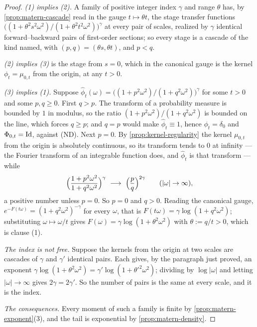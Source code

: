 \begin{proof}
\emph{(1) implies (2).} A \Matern{} family of positive integer index $\gamma$ and range $\theta$
has, by \ref{prop:matern-cascade} read in the gauge $t \mapsto \theta t$, the stage transfer
functions $\bigl((1+\theta^2s^2\omega^2)/(1+\theta^2t^2\omega^2)\bigr)^\gamma$ at every pair of
scales, realized by $\gamma$ identical forward--backward pairs of first-order sections; so every
stage is a cascade of the kind named, with $(p,q) = (\theta s, \theta t)$, and $p < q$.

\emph{(2) implies (3)} is the stage from $s = 0$, which in the canonical gauge is the kernel
$\phi_t = \mu_{0,t}$ from the origin, at any $t > 0$.

\emph{(3) implies (1).} Suppose $\hat\phi_t(\omega) = \bigl((1+p^2\omega^2)/(1+q^2\omega^2)\bigr)
^{\gamma}$ for some $t > 0$ and some $p, q \ge 0$. First $q > p$. The transform of a probability
measure is bounded by $1$ in modulus, so the ratio $(1+p^2\omega^2)/(1+q^2\omega^2)$ is bounded on
the line, which forces $q \ge p$; and $q = p$ would make $\hat\phi_t \equiv 1$, hence
$\phi_t = \delta_0$ and $\Phi_{0,t} = \mathrm{Id}$, against (ND). Next $p = 0$. By
\ref{prop:kernel-regularity} the kernel $\mu_{0,t}$ from the origin is absolutely continuous, so
its transform tends to $0$ at infinity --- the Fourier transform of an integrable function does,
and $\hat\phi_t$ is that transform --- while
\[
  \Bigl(\frac{1 + p^2\omega^2}{1 + q^2\omega^2}\Bigr)^{\gamma}
  \ \longrightarrow\ \Bigl(\frac pq\Bigr)^{2\gamma}
  \qquad (|\omega| \to \infty),
\]
a positive number unless $p = 0$. So $p = 0$ and $q > 0$. Reading the canonical gauge,
$e^{-F(t\omega)} = (1+q^2\omega^2)^{-\gamma}$ for every $\omega$, that is
$F(t\omega) = \gamma\log(1+q^2\omega^2)$; substituting $\omega \mapsto \omega/t$ gives
$F(\omega) = \gamma\log(1+\theta^2\omega^2)$ with $\theta := q/t > 0$, which is clause (1).

\emph{The index is not free.} Suppose the kernels from the origin at two scales are cascades of
$\gamma$ and $\gamma'$ identical pairs. Each gives, by the paragraph just proved, an exponent
$\gamma\log(1+\theta^2\omega^2) = \gamma'\log(1+\theta'^2\omega^2)$; dividing by $\log|\omega|$
and letting $|\omega| \to \infty$ gives $2\gamma = 2\gamma'$. So the number of pairs is the same
at every scale, and it is the index.

\emph{The consequences.} Every moment of such a family is finite by \ref{prop:matern-exponent}(3),
and the tail is exponential by \ref{prop:matern-density}.
\end{proof}

